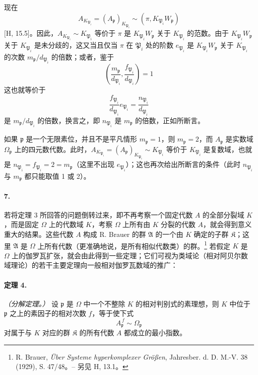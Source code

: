 \documentclass[11pt]{article}
\begin{document}
现在
\[
        A_{K_{\mathfrak P_i}}=(A_{\mathfrak p})_{K_{\mathfrak P_i}}\sim(\pi,K_{\mathfrak P_i}W_{\mathfrak p})
\]
[H, 15.5]。因此，\(A_{K_{\mathfrak P_i}}\sim K_{\mathfrak P_i}\) 等价于 \(\pi\) 是 \(K_{\mathfrak P_i}W_{\mathfrak p}\) 关于 \(K_{\mathfrak P_i}\) 的范数。由于 \(K_{\mathfrak P_i}W_{\mathfrak p}\) 关于 \(K_{\mathfrak P_i}\) 是未分歧的，这又当且仅当 \(\pi\) 在 \(\mathfrak P_i\) 处的阶数 \(e_{\mathfrak P_i}\) 是 \(K_{\mathfrak P_i}W_{\mathfrak p}\) 关于 \(K_{\mathfrak P_i}\) 的次数 \(m_{\mathfrak p}/d_{\mathfrak P_i}\) 的倍数；或者，鉴于
\[
\left(\frac{m_{\mathfrak p}}{d_{\mathfrak P_i}},\frac{f_{\mathfrak P_i}}{d_{\mathfrak P_i}}\right)=1
\]
这也就等价于
\[
\frac{f_{\mathfrak P_i}}{d_{\mathfrak P_i}}e_{\mathfrak P_i}=\frac{n_{\mathfrak P_i}}{d_{\mathfrak P_i}}
\]
是 \(m_{\mathfrak p}/d_{\mathfrak P_i}\) 的倍数，换言之，即 \(n_{\mathfrak P_i}\) 是 \(m_{\mathfrak p}\) 的倍数，正如所断言。

如果 \(\mathfrak p\) 是一个无限素位，并且不是平凡情形 \(m_{\mathfrak p}=1\)，则 \(m_{\mathfrak p}=2\)，而 \(A_{\mathfrak p}\) 是实数域 \(\Omega_{\mathfrak p}\) 上的四元数代数。此时，\(A_{K_{\mathfrak P_i}}=(A_{\mathfrak p})_{K_{\mathfrak P_i}}\sim K_{\mathfrak P_i}\) 等价于 \(K_{\mathfrak P_i}\) 是复数域，也就是 \(n_{\mathfrak P_i}=f_{\mathfrak P_i}=2=m_{\mathfrak p}\)（这里不出现 \(e_{\mathfrak P_i}\)）；这也再次给出所断言的条件（此时 \(n_{\mathfrak P_i}\) 与 \(m_{\mathfrak p}\) 都只能取值 1 或 2）。

\paragraph{7.}
若将定理 3 所回答的问题倒转过来，即不再考察一个固定代数 \(A\) 的全部分裂域 \(K\)，而是固定 \(\Omega\) 上的代数域 \(K\)，考察 \(\Omega\) 上所有由 \(K\) 分裂的代数 \(A\)，就会得到意义重大的结果。这些代数 \(A\) 构成 R. Brauer 的群 \(\mathfrak A\) 的一个由 \(K\) 确定的子群 \(\mathfrak K\)；这里 \(\mathfrak A\) 是 \(\Omega\) 上所有代数（更准确地说，是所有相似代数类）的群。\footnote{R. Brauer, \emph{Über Systeme hyperkomplexer Größen}, Jahresber. d. D. M.-V. 38 (1929), S. 47/48。-- 另见 H, 13.1。} 若假定 \(K\) 是 \(\Omega\) 上的伽罗瓦扩张，就会由此得到一些定理；它们可视为类域论（相对阿贝尔数域理论）的若干主要定理向一般相对伽罗瓦数域的推广：

\paragraph{定理 4.}
\emph{（分解定理。）} 设 \(\mathfrak p\) 是 \(\Omega\) 中一个不整除 \(K\) 的相对判别式的素理想，则 \(K\) 中位于 \(\mathfrak p\) 之上的素因子的相对次数 \(f\)，等于使下式
\[
        A_{\mathfrak p}^{\,f}\sim\Omega_{\mathfrak p}
\]
对属于与 \(K\) 对应的群 \(\mathfrak K\) 的所有代数 \(A\) 都成立的最小指数。
\end{document}
